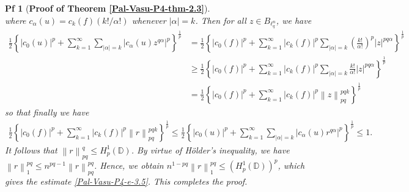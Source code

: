 \documentclass[10pt,a4paper]{amsart}
\newtheorem{pf}{Pf}
\newcommand{\norm}[1]{\left\lVert#1\right\rVert}
\begin{document}
\begin{pf} [{\bf Proof of Theorem \ref{Pal-Vasu-P4-thm-2.3}}]
\begin{equation*}
	\end{equation*}
	where $c_{\alpha}(u)=c_k(f)(k!/\alpha!)$ whenever $|\alpha|=k$. Then for all $z\in B_{\ell^n_q}$, we have
	\begin{align*}
		\frac{1}{2}\left\{|c_0(u)|^p + \sum_{k=1}^{\infty}\sum_{|\alpha|=k}|c_{\alpha}(u)z^{q\alpha}|^p\right\}^{\frac{1}{p}} &= \frac{1}{2}\left\{|c_0(f)|^p+\sum_{k=1}^{\infty}|c_{k}(f)|^p\sum_{|\alpha|=k}\left(\frac{k!}{\alpha!}\right)^p|z|^{pq\alpha}\right\}^{\frac{1}{p}}\\& \geq 
		\frac{1}{2}\left\{|c_0(f)|^p+\sum_{k=1}^{\infty}|c_{k}(f)|^p\sum_{|\alpha|=k}\frac{k!}{\alpha!}|z|^{pq\alpha}\right\}^{\frac{1}{p}}\\ & = 
		\frac{1}{2}\left\{|c_0(f)|^p+\sum_{k=1}^{\infty}|c_{k}(f)|^p\norm{z}^{pqk}_{pq}\right\}^{\frac{1}{p}}
	\end{align*}
	so that finally we have 
	\begin{align*}
		\frac{1}{2}\left\{|c_0(f)|^p+\sum_{k=1}^{\infty}|c_{k}(f)|^p\norm{r}^{pqk}_{pq}\right\}^{\frac{1}{p}}\leq \frac{1}{2}\left\{|c_0(u)|^p + \sum_{k=1}^{\infty}\sum_{|\alpha|=k}|c_{\alpha}(u)r^{q\alpha}|^p\right\}^{\frac{1}{p}}\leq 1. 
	\end{align*}
	It follows that $\norm{r}^q_{pq}\leq H^1_{p}(\mathbb{D})$. By virtue of H\"{o}lder's inequality, we have $\norm{r}^{pq}_{1}\leq n^{pq-1}\norm{r}^{pq}_{pq}$. Hence, we obtain $n^{1-pq}\norm{r}^{pq}_{1}\leq (H^1_{p}(\mathbb{D}))^p$, which gives the estimate \eqref{Pal-Vasu-P4-e-3.5}. This completes the proof. 
\end{pf}
\end{document}
